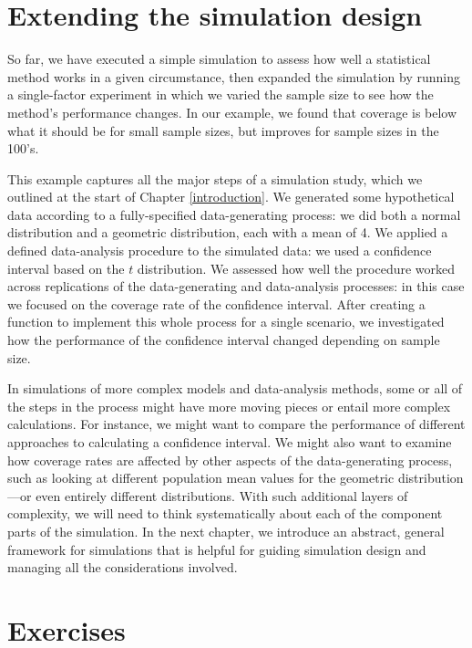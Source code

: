 \documentclass[
]{book}
\begin{document}
\section{Extending the simulation design}\label{extending-the-simulation-design}

So far, we have executed a simple simulation to assess how well a statistical method works in a given circumstance, then expanded the simulation by running a single-factor experiment in which we varied the sample size to see how the method's performance changes.
In our example, we found that coverage is below what it should be for small sample sizes, but improves for sample sizes in the 100's.

This example captures all the major steps of a simulation study, which we outlined at the start of Chapter \ref{introduction}.
We generated some hypothetical data according to a fully-specified data-generating process: we did both a normal distribution and a geometric distribution, each with a mean of 4.
We applied a defined data-analysis procedure to the simulated data: we used a confidence interval based on the \(t\) distribution.
We assessed how well the procedure worked across replications of the data-generating and data-analysis processes: in this case we focused on the coverage rate of the confidence interval.
After creating a function to implement this whole process for a single scenario, we investigated how the performance of the confidence interval changed depending on sample size.

In simulations of more complex models and data-analysis methods, some or all of the steps in the process might have more moving pieces or entail more complex calculations.
For instance, we might want to compare the performance of different approaches to calculating a confidence interval.
We might also want to examine how coverage rates are affected by other aspects of the data-generating process, such as looking at different population mean values for the geometric distribution---or even entirely different distributions.
With such additional layers of complexity, we will need to think systematically about each of the component parts of the simulation.
In the next chapter, we introduce an abstract, general framework for simulations that is helpful for guiding simulation design and managing all the considerations involved.

\section{Exercises}\label{exercises-1}
\end{document}
